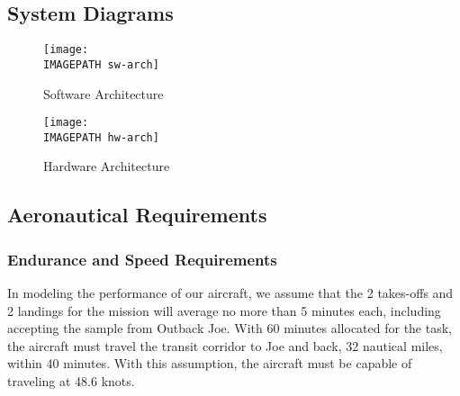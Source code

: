 \subsection{System Diagrams}

\begin{figure}[H]
	\centering
	\texttt{[image: \\IMAGEPATH sw-arch]}
	\caption{Software Architecture}
	\label{fig:sw-arch}
\end{figure}

\begin{figure}[H]
	\centering
	\texttt{[image: \\IMAGEPATH hw-arch]}
	\caption{Hardware Architecture}
	\label{fig:hw-arch}
\end{figure}

\subsection{Aeronautical Requirements}
\subsubsection{Endurance and Speed Requirements}
In modeling the performance of our aircraft, we assume that the 2 takes-offs and 2 landings for the mission will average no more than 5 minutes each, including accepting the sample from Outback Joe. With 60 minutes allocated for the task, the aircraft must travel the transit corridor to Joe and back, 32 nautical miles, within 40 minutes. With this assumption, the aircraft must be capable of traveling at 48.6 knots. 


